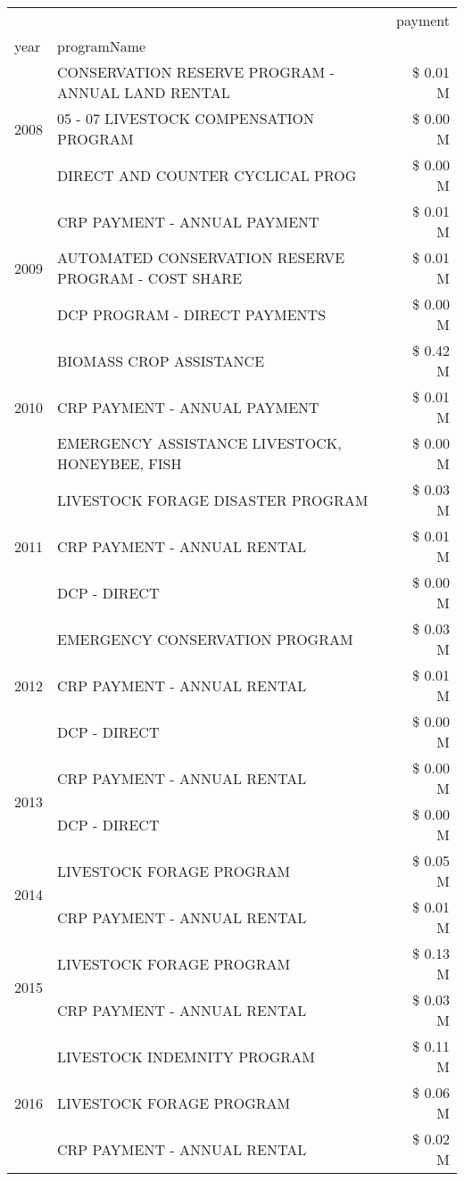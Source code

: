 \begin{tabular}{llr}
\toprule
 &  & payment \\
year & programName &  \\
\midrule
\multirow[t]{3}{*}{2008} & CONSERVATION RESERVE PROGRAM - ANNUAL LAND RENTAL & \$ 0.01 M \\
 & 05 - 07 LIVESTOCK COMPENSATION PROGRAM & \$ 0.00 M \\
 & DIRECT AND COUNTER CYCLICAL PROG & \$ 0.00 M \\
\cline{1-3}
\multirow[t]{3}{*}{2009} & CRP PAYMENT - ANNUAL PAYMENT & \$ 0.01 M \\
 & AUTOMATED CONSERVATION RESERVE PROGRAM - COST SHARE & \$ 0.01 M \\
 & DCP PROGRAM - DIRECT PAYMENTS & \$ 0.00 M \\
\cline{1-3}
\multirow[t]{3}{*}{2010} & BIOMASS CROP ASSISTANCE & \$ 0.42 M \\
 & CRP PAYMENT - ANNUAL PAYMENT & \$ 0.01 M \\
 & EMERGENCY ASSISTANCE LIVESTOCK, HONEYBEE, FISH & \$ 0.00 M \\
\cline{1-3}
\multirow[t]{3}{*}{2011} & LIVESTOCK FORAGE DISASTER PROGRAM & \$ 0.03 M \\
 & CRP PAYMENT - ANNUAL RENTAL & \$ 0.01 M \\
 & DCP - DIRECT & \$ 0.00 M \\
\cline{1-3}
\multirow[t]{3}{*}{2012} & EMERGENCY CONSERVATION PROGRAM & \$ 0.03 M \\
 & CRP PAYMENT - ANNUAL RENTAL & \$ 0.01 M \\
 & DCP - DIRECT & \$ 0.00 M \\
\cline{1-3}
\multirow[t]{2}{*}{2013} & CRP PAYMENT - ANNUAL RENTAL & \$ 0.00 M \\
 & DCP - DIRECT & \$ 0.00 M \\
\cline{1-3}
\multirow[t]{2}{*}{2014} & LIVESTOCK FORAGE PROGRAM & \$ 0.05 M \\
 & CRP PAYMENT - ANNUAL RENTAL & \$ 0.01 M \\
\cline{1-3}
\multirow[t]{2}{*}{2015} & LIVESTOCK FORAGE PROGRAM & \$ 0.13 M \\
 & CRP PAYMENT - ANNUAL RENTAL & \$ 0.03 M \\
\cline{1-3}
\multirow[t]{3}{*}{2016} & LIVESTOCK INDEMNITY PROGRAM & \$ 0.11 M \\
 & LIVESTOCK FORAGE PROGRAM & \$ 0.06 M \\
 & CRP PAYMENT - ANNUAL RENTAL & \$ 0.02 M \\

\end{tabular}
